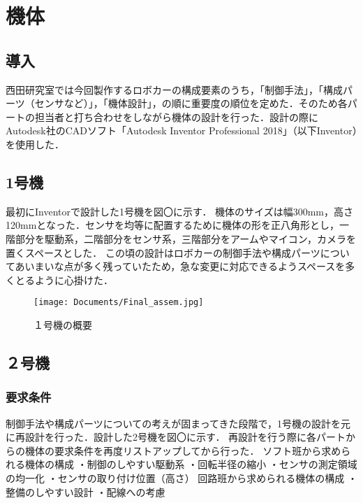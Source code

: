 \documentclass{jsarticle}
\begin{document}
\section{機体}

\subsection{導入}
西田研究室では今回製作するロボカーの構成要素のうち，「制御手法」，「構成パーツ（センサなど）」，「機体設計」，の順に重要度の順位を定めた．そのため各パートの担当者と打ち合わせをしながら機体の設計を行った．設計の際にAutodesk社のCADソフト「Autodesk Inventor Professional 2018」（以下Inventor）を使用した．

\subsection{1号機}
最初にInventorで設計した1号機を図〇に示す．
機体のサイズは幅300mm，高さ120mmとなった．センサを均等に配置するために機体の形を正八角形とし，一階部分を駆動系，二階部分をセンサ系，三階部分をアームやマイコン，カメラを置くスペースとした．
この頃の設計はロボカーの制御手法や構成パーツについてあいまいな点が多く残っていたため，急な変更に対応できるようスペースを多くとるように心掛けた．

\begin{figure}[htbp]
\begin{center}
  \texttt{[image: Documents/Final\_assem.jpg]}
\end{center}
\caption{１号機の概要}
\label{picture}
\end{figure}

\subsection{２号機}

\subsubsection{要求条件}
制御手法や構成パーツについての考えが固まってきた段階で，1号機の設計を元に再設計を行った．設計した2号機を図〇に示す．
再設計を行う際に各パートからの機体の要求条件を再度リストアップしてから行った．
ソフト班から求められる機体の構成
・制御のしやすい駆動系
・回転半径の縮小
・センサの測定領域の均一化
・センサの取り付け位置（高さ）
回路班から求められる機体の構成
・整備のしやすい設計
・配線への考慮
\end{document}
